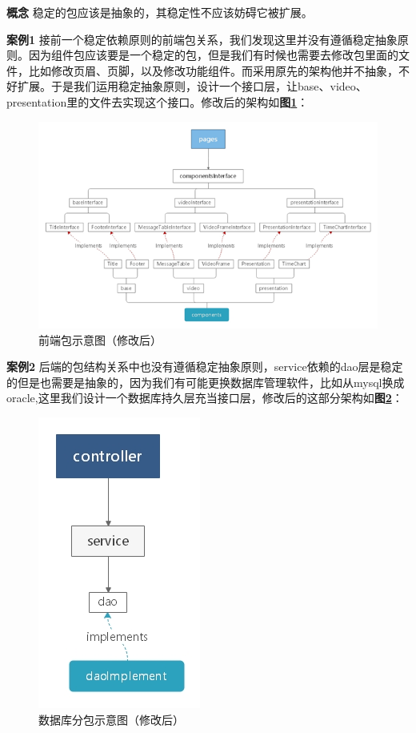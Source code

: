 \documentclass[article]{BJTU-thesis}
\begin{document}
\textbf{概念} 稳定的包应该是抽象的，其稳定性不应该妨碍它被扩展。

\textbf{案例1} 接前一个稳定依赖原则的前端包关系，我们发现这里并没有遵循稳定抽象原则。因为组件包应该要是一个稳定的包，但是我们有时候也需要去修改包里面的文件，比如修改页眉、页脚，以及修改功能组件。而采用原先的架构他并不抽象，不好扩展。于是我们运用稳定抽象原则，设计一个接口层，让base、video、presentation里的文件去实现这个接口。修改后的架构如\textbf{图\ref{fig:fig23}}：

\begin{figure}[!htbp]
	\centering
	\includegraphics[scale=0.8]{img/14.png}
	\caption{前端包示意图（修改后）}\label{fig:fig23}
\end{figure}

\newpage

\textbf{案例2} 后端的包结构关系中也没有遵循稳定抽象原则，service依赖的dao层是稳定的但是也需要是抽象的，因为我们有可能更换数据库管理软件，比如从mysql换成oracle,这里我们设计一个数据库持久层充当接口层，修改后的这部分架构如\textbf{图\ref{fig:fig24}}：

\begin{figure}[!htbp]
	\centering
	\includegraphics[scale=0.8]{img/20.jpg}
	\caption{数据库分包示意图（修改后）}\label{fig:fig24}
\end{figure}
\end{document}

